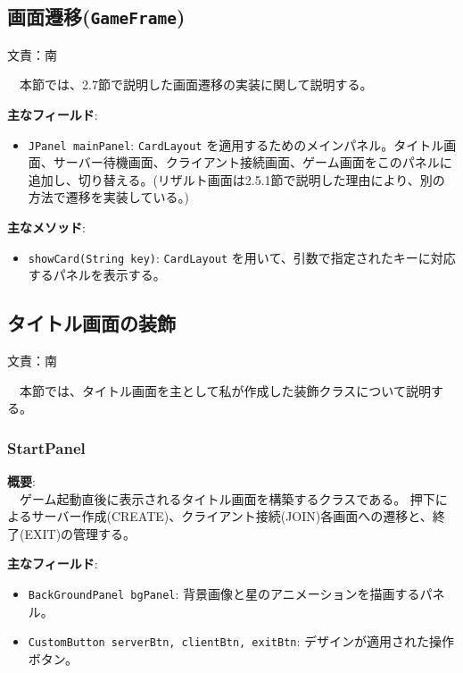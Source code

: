 \documentclass[11pt,a4j]{jarticle}
\begin{document}

\subsection{画面遷移(\texttt{GameFrame})}
\begin{flushright}
  文責：南
\end{flushright}
　本節では、2.7節で説明した画面遷移の実装に関して説明する。

\noindent\textbf{主なフィールド}:
\begin{itemize}
    \item \texttt{JPanel mainPanel}: \texttt{CardLayout} を適用するためのメインパネル。タイトル画面、サーバー待機画面、クライアント接続画面、ゲーム画面をこのパネルに追加し、切り替える。(リザルト画面は2.5.1節で説明した理由により、別の方法で遷移を実装している。)
\end{itemize}

\noindent\textbf{主なメソッド}:
\begin{itemize}
    \item \texttt{showCard(String key)}: \texttt{CardLayout} を用いて、引数で指定されたキーに対応するパネルを表示する。
\end{itemize}


\subsection{タイトル画面の装飾}
\begin{flushright}
文責：南
\end{flushright}
　本節では、タイトル画面を主として私が作成した装飾クラスについて説明する。

\subsubsection{StartPanel}
\noindent\textbf{概要}: \\
　ゲーム起動直後に表示されるタイトル画面を構築するクラスである。
押下によるサーバー作成(CREATE)、クライアント接続(JOIN)各画面への遷移と、終了(EXIT)の管理する。

\noindent\textbf{主なフィールド}:
\begin{itemize}
    \item \texttt{BackGroundPanel bgPanel}: 背景画像と星のアニメーションを描画するパネル。
    \item \texttt{CustomButton serverBtn, clientBtn, exitBtn}: デザインが適用された操作ボタン。
\end{itemize}
\end{document}
